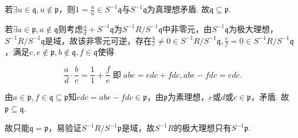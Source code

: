 若$\exists u\in\mathfrak{q}, u\notin\mathfrak{p}$，则$1=\frac{u}{u}\in S^{-1}\mathfrak{q}$与$S^{-1}\mathfrak{q}$为真理想矛盾. 故$\mathfrak{q}\subseteq\mathfrak{p}$.

若$\exists a\in\mathfrak{p}, a\notin\mathfrak{q}$则考虑$\frac{a}{d}+S^{-1}\mathfrak{q}$为$S^{-1}R/S^{-1}\mathfrak{q}$中非零元，由$S^{-1}\mathfrak{q}$为极大理想，$S^{-1}R/S^{-1}\mathfrak{q}$是域，故该非零元可逆，存在$\frac{b}{c}\neq 0\in S^{-1}R/S^{-1}\mathfrak{q}, \frac{e}{f}=0\in S^{-1}R/S^{-1}\mathfrak{q}$，满足$c,e\notin\mathfrak{p}, b\notin\mathfrak{q}, f\in\mathfrak{q}$使得

$$\frac{a}{d}\cdot\frac{b}{c}=\frac{1}{1}+\frac{f}{e}\;\text{即}\;abe=edc+fdc, abe-fdc=edc.$$

由$a\in\mathfrak{p}, f\in\mathfrak{q}\subseteq\mathfrak{p}$知$edc=abe-fdc\in\mathfrak{p}$，由$\mathfrak{p}$为素理想，$e$或$d$或$c\in\mathfrak{p}$，矛盾. 故$\mathfrak{p}\subseteq \mathfrak{q}$.

故只能$\mathfrak{q}=\mathfrak{p}$，易验证$S^{-1}R/S^{-1}\mathfrak{p}$是域，故$S^{-1}R$的极大理想只有$S^{-1}\mathfrak{p}$.